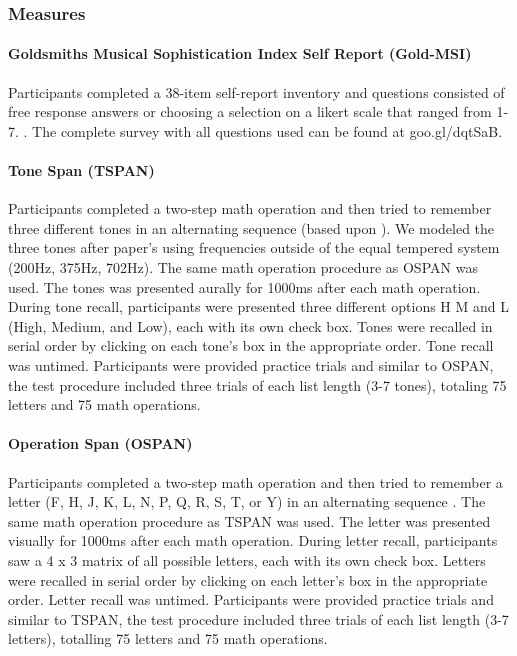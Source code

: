 \documentclass[]{book}
\let\oldparagraph\paragraph
\renewcommand{\paragraph}[1]{\oldparagraph{#1}\mbox{}}
\begin{document}
\hypertarget{measures}{%
\subsubsection{Measures}\label{measures}}

\hypertarget{goldsmiths-musical-sophistication-index-self-report-gold-msi}{%
\paragraph{Goldsmiths Musical Sophistication Index Self Report (Gold-MSI)}\label{goldsmiths-musical-sophistication-index-self-report-gold-msi}}

Participants completed a 38-item self-report inventory and questions consisted of free response answers or choosing a
selection on a likert scale that ranged from 1-7. \citep{mullensiefenMusicalityNonMusiciansIndex2014}.
The complete survey with all questions used can be found at goo.gl/dqtSaB.

\hypertarget{tone-span-tspan}{%
\paragraph{Tone Span (TSPAN)}\label{tone-span-tspan}}

Participants completed a two-step math operation and then tried to remember three different tones in an alternating sequence (based upon \citet{unsworthAutomatedVersionOperation2005}).
We modeled the three tones after \citet{liEstimatingWorkingMemory2013} paper's using frequencies outside of the equal tempered system (200Hz, 375Hz, 702Hz).
The same math operation procedure as OSPAN was used.
The tones was presented aurally for 1000ms after each math operation.
During tone recall, participants were presented three different options H M and L (High, Medium, and Low), each with its own check box.
Tones were recalled in serial order by clicking on each tone's box in the appropriate order.
Tone recall was untimed.
Participants were provided practice trials and similar to OSPAN, the test procedure included three trials of each list length (3-7 tones), totaling 75 letters and 75 math operations.

\hypertarget{operation-span-ospan}{%
\paragraph{Operation Span (OSPAN)}\label{operation-span-ospan}}

Participants completed a two-step math operation and then tried to remember a letter (F, H, J, K, L, N, P, Q, R, S, T, or
Y) in an alternating sequence \citep{unsworthAutomatedVersionOperation2005}.
The same math operation procedure as TSPAN was used.
The letter was presented visually for 1000ms after each math
operation.
During letter recall, participants saw a 4 x 3 matrix of all possible letters, each with its own check box.
Letters were recalled in serial order by clicking on each letter's box in the appropriate order.
Letter recall was untimed.
Participants were provided practice trials and similar to TSPAN, the test procedure included three trials of each list length (3-7 letters), totalling 75 letters and 75 math operations.
\end{document}
